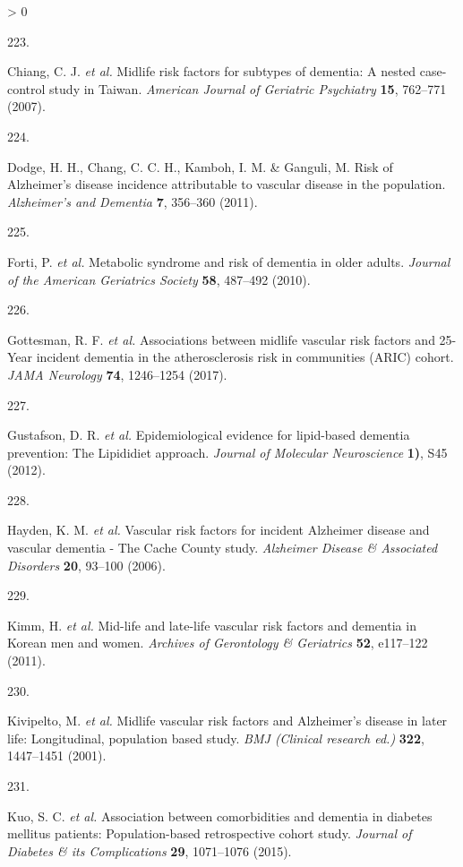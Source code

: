 \documentclass[a4paper, twoside]{templates/ociamthesis}
\newlength{\cslhangindent}
\newlength{\csllabelwidth}
\newenvironment{CSLReferences}[3] %
 {%
  \setlength{\parindent}{0pt}
  \ifodd #1 \everypar{\setlength{\hangindent}{\cslhangindent}}\ignorespaces\fi
  \ifnum #2 > 0
  \setlength{\parskip}{#2\baselineskip}
  \fi
 }%
 {}
\newcommand{\CSLLeftMargin}[1]{\parbox[t]{\maxof{\widthof{#1}}{\csllabelwidth}}{#1}}
\newcommand{\CSLRightInline}[1]{\parbox[t]{\linewidth - \csllabelwidth}{#1}}
\begin{document}
\begin{CSLReferences}{0}{0}
\leavevmode\hypertarget{ref-chiang2007}{}%
\CSLLeftMargin{223. }
\CSLRightInline{Chiang, C. J. \emph{et al.} Midlife risk factors for subtypes of dementia: A nested case-control study in {Taiwan}. \emph{American Journal of Geriatric Psychiatry} \textbf{15}, 762--771 (2007).}

\leavevmode\hypertarget{ref-dodge2011}{}%
\CSLLeftMargin{224. }
\CSLRightInline{Dodge, H. H., Chang, C. C. H., Kamboh, I. M. \& Ganguli, M. Risk of {Alzheimer}'s disease incidence attributable to vascular disease in the population. \emph{Alzheimer's and Dementia} \textbf{7}, 356--360 (2011).}

\leavevmode\hypertarget{ref-forti2010}{}%
\CSLLeftMargin{225. }
\CSLRightInline{Forti, P. \emph{et al.} Metabolic syndrome and risk of dementia in older adults. \emph{Journal of the American Geriatrics Society} \textbf{58}, 487--492 (2010).}

\leavevmode\hypertarget{ref-gottesman2017}{}%
\CSLLeftMargin{226. }
\CSLRightInline{Gottesman, R. F. \emph{et al.} Associations between midlife vascular risk factors and 25-{Year} incident dementia in the atherosclerosis risk in communities ({ARIC}) cohort. \emph{JAMA Neurology} \textbf{74}, 1246--1254 (2017).}

\leavevmode\hypertarget{ref-gustafson2012}{}%
\CSLLeftMargin{227. }
\CSLRightInline{Gustafson, D. R. \emph{et al.} Epidemiological evidence for lipid-based dementia prevention: The {Lipididiet} approach. \emph{Journal of Molecular Neuroscience} \textbf{1)}, S45 (2012).}

\leavevmode\hypertarget{ref-hayden2006}{}%
\CSLLeftMargin{228. }
\CSLRightInline{Hayden, K. M. \emph{et al.} Vascular risk factors for incident {Alzheimer} disease and vascular dementia - {The Cache County} study. \emph{Alzheimer Disease \& Associated Disorders} \textbf{20}, 93--100 (2006).}

\leavevmode\hypertarget{ref-kimm2011}{}%
\CSLLeftMargin{229. }
\CSLRightInline{Kimm, H. \emph{et al.} Mid-life and late-life vascular risk factors and dementia in {Korean} men and women. \emph{Archives of Gerontology \& Geriatrics} \textbf{52}, e117--122 (2011).}

\leavevmode\hypertarget{ref-kivipelto2001}{}%
\CSLLeftMargin{230. }
\CSLRightInline{Kivipelto, M. \emph{et al.} Midlife vascular risk factors and {Alzheimer}'s disease in later life: Longitudinal, population based study. \emph{BMJ (Clinical research ed.)} \textbf{322}, 1447--1451 (2001).}

\leavevmode\hypertarget{ref-kuo2015}{}%
\CSLLeftMargin{231. }
\CSLRightInline{Kuo, S. C. \emph{et al.} Association between comorbidities and dementia in diabetes mellitus patients: Population-based retrospective cohort study. \emph{Journal of Diabetes \& its Complications} \textbf{29}, 1071--1076 (2015).}


\end{CSLReferences}
\end{document}
